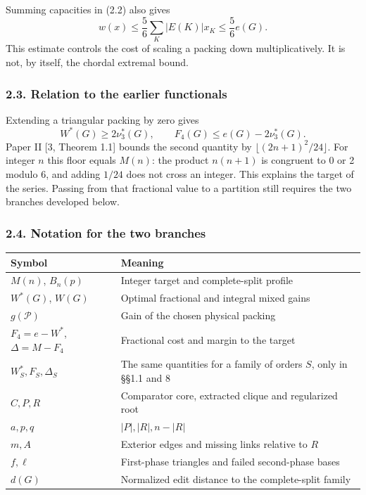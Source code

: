 \documentclass[english,11pt,a4paper]{article}
\newcounter{none}
\begin{document}
Summing capacities in (2.2) also gives \[
w(x)\le\frac56\sum_K |E(K)|x_K\le\frac56e(G).
\tag{2.4}
\] This estimate controls the cost of scaling a packing down multiplicatively. It is not, by itself, the chordal extremal bound.

\subsubsection{2.3. Relation to the earlier functionals}\label{relation-to-the-earlier-functionals}

Extending a triangular packing by zero gives \[
W^*(G)\ge2\nu_3^*(G),\qquad
F_4(G)\le e(G)-2\nu_3^*(G).
\tag{2.5}
\] Paper II {[}3, Theorem 1.1{]} bounds the second quantity by \(\lfloor(2n+1)^2/24\rfloor\). For integer \(n\) this floor equals \(M(n)\): the product \(n(n+1)\) is congruent to 0 or 2 modulo 6, and adding \(1/24\) does not cross an integer. This explains the target of the series. Passing from that fractional value to a partition still requires the two branches developed below.

\subsubsection{2.4. Notation for the two branches}\label{notation-for-the-two-branches}

{\def\LTcaptype{none} %
\begin{longtable}[c]{@{}
  >{\raggedright\arraybackslash}p{}
  >{\raggedright\arraybackslash}p{}@{}}
\toprule\noalign{}
\begin{minipage}[b]{\linewidth}\raggedright
Symbol
\end{minipage} & \begin{minipage}[b]{\linewidth}\raggedright
Meaning
\end{minipage} \\
\midrule\noalign{}
\endhead
\bottomrule\noalign{}
\endlastfoot
\(M(n)\), \(B_n(p)\) & Integer target and complete-split profile \\
\(W^*(G)\), \(W(G)\) & Optimal fractional and integral mixed gains \\
\(g(\mathcal P)\) & Gain of the chosen physical packing \\
\(F_4=e-W^*\), \(\Delta=M-F_4\) & Fractional cost and margin to the target \\
\(W_S^*,F_S,\Delta_S\) & The same quantities for a family of orders \(S\), only in §§1.1 and 8 \\
\(C,P,R\) & Comparator core, extracted clique and regularized root \\
\(a,p,q\) & \(|P|,|R|,n-|R|\) \\
\(m,A\) & Exterior edges and missing links relative to \(R\) \\
\(f,\ell\) & First-phase triangles and failed second-phase bases \\
\(d(G)\) & Normalized edit distance to the complete-split family \\
\end{longtable}
}
\end{document}
